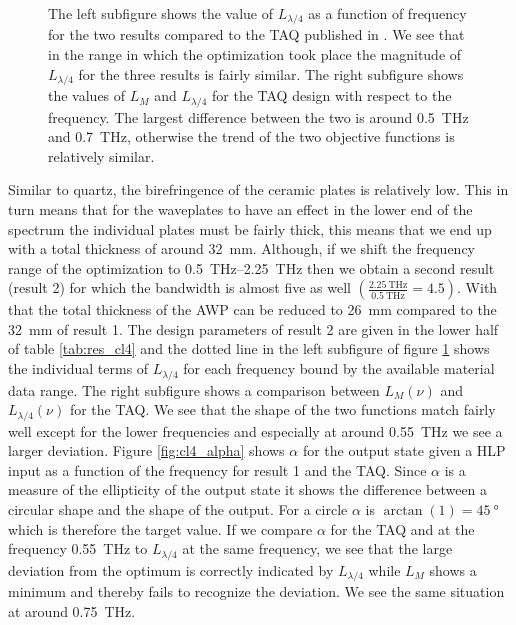 \begin{figure}[H]
    \centering
    
    \caption{The left subfigure shows the value of $L_{\lambda/4}$ as a function of frequency for the two results compared to the TAQ published in \cite{Masson2006}. We see that in the range in which the optimization took place the magnitude of $L_{\lambda/4}$ for the three results is fairly similar. The right subfigure shows the values of $L_M$ and $L_{\lambda/4}$ for the TAQ design with respect to the frequency. The largest difference between the two is around \SI{0.5}{\tera \hertz} and \SI{0.7}{\tera \hertz}, otherwise the trend of the two objective functions is relatively similar.}
    \label{fig:loss_function_cl4}
\end{figure}

Similar to quartz, the birefringence of the ceramic plates is relatively low. This in turn means that for the waveplates to have an effect in the lower end of the spectrum the individual plates must be fairly thick, this means that we end up with a total thickness of around \SI{32}{\milli \meter}. Although, if we shift the frequency range of the optimization to \SIrange[range-phrase=-, range-units=single]{0.5}{2.25}{\tera \hertz} then we obtain a second result (result 2) for which the bandwidth is almost five as well $\left(\frac{\SI{2.25}{\tera \hertz}}{\SI{0.5}{\tera \hertz}}=4.5\right)$. With that the total thickness of the AWP can be reduced to \SI{26}{\milli \meter} compared to the \SI{32}{\milli \meter} of result 1. The design parameters of result 2 are given in the lower half of table \ref{tab:res_cl4} and the dotted line in the left subfigure of figure \ref{fig:loss_function_cl4} shows the individual terms of $L_{\lambda/4}$ for each frequency bound by the available material data range. The right subfigure shows a comparison between $L_M(\nu)$ and $L_{\lambda/4}(\nu)$ for the TAQ. We see that the shape of the two functions match fairly well except for the lower frequencies and especially at around \SI{0.55}{\tera \hertz} we see a larger deviation. Figure \ref{fig:cl4_alpha} shows $\alpha$ for the output state given a HLP input as a function of the frequency for result 1 and the TAQ. Since $\alpha$ is a measure of the ellipticity of the output state it shows the difference between a circular shape and the shape of the output. For a circle $\alpha$ is $\arctan(1)=\SI{45}{\degree}$ which is therefore the target value. If we compare $\alpha$ for the TAQ and at the frequency \SI{0.55}{\tera \hertz} to $L_{\lambda/4}$ at the same frequency, we see that the large deviation from the optimum is correctly indicated by $L_{\lambda/4}$ while $L_M$ shows a minimum and thereby fails to recognize the deviation. We see the same situation at around \SI{0.75}{\tera \hertz}.

